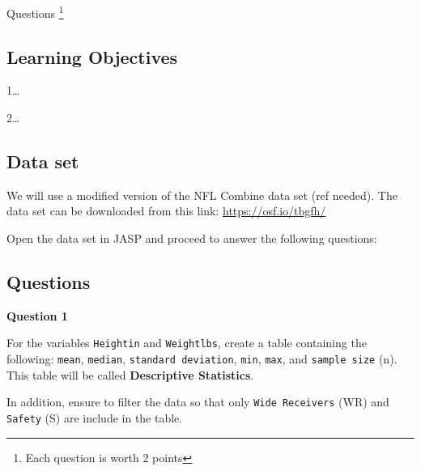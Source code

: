 \documentclass[11pt,]{article}
\begin{document}
Questions \footnote{Each question is worth 2 points}

\hypertarget{learning-objectives-1}{%
\subsection{Learning Objectives}\label{learning-objectives-1}}

1\ldots{}

2\ldots{}

\hypertarget{data-set}{%
\subsection{Data set}\label{data-set}}

We will use a modified version of the NFL Combine data set (ref needed).
The data set can be downloaded from this link:
\url{https://osf.io/tbgfh/}

Open the data set in JASP and proceed to answer the following questions:

\hypertarget{questions}{%
\subsection{Questions}\label{questions}}

\textbf{Question 1}

For the variables \texttt{Heightin} and \texttt{Weightlbs}, create a
table containing the following: \texttt{mean}, \texttt{median},
\texttt{standard\ deviation}, \texttt{min}, \texttt{max}, and
\texttt{sample\ size} (n). This table will be called \textbf{Descriptive
Statistics}.

In addition, ensure to filter the data so that only
\texttt{Wide\ Receivers} (WR) and \texttt{Safety} (S) are include in the
table.
\end{document}
